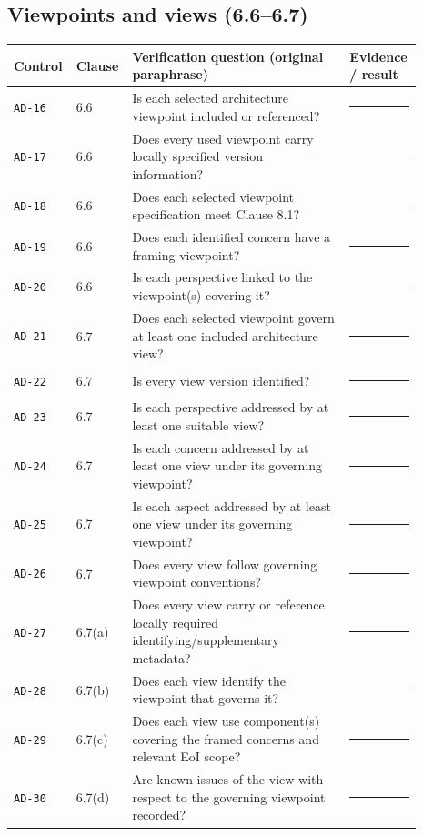 \documentclass[11pt,letterpaper]{article}
\newcommand{\AuditingHead}{\begin{longtable}{p{0.10\linewidth}p{0.10\linewidth}p{0.52\linewidth}p{0.17\linewidth}}\toprule\textbf{Control}&\textbf{Clause}&\textbf{Verification question (original paraphrase)}&\textbf{Evidence / result}\\\midrule\endhead}
\newcommand{\AuditingEnd}{\bottomrule\end{longtable}}
\newcommand{\AuditRow}[4]{\texttt{#1} & #2 & #3 & #4\\}
\begin{document}
\subsection{Viewpoints and views (6.6--6.7)}
\AuditingHead
\AuditRow{AD-16}{6.6}{Is each selected architecture viewpoint included or referenced?}{\rule[-0.4em]{0pt}{2em}\rule{0.60\linewidth}{0.4pt}}
\AuditRow{AD-17}{6.6}{Does every used viewpoint carry locally specified version information?}{\rule[-0.4em]{0pt}{2em}\rule{0.60\linewidth}{0.4pt}}
\AuditRow{AD-18}{6.6}{Does each selected viewpoint specification meet Clause 8.1?}{\rule[-0.4em]{0pt}{2em}\rule{0.60\linewidth}{0.4pt}}
\AuditRow{AD-19}{6.6}{Does each identified concern have a framing viewpoint?}{\rule[-0.4em]{0pt}{2em}\rule{0.60\linewidth}{0.4pt}}
\AuditRow{AD-20}{6.6}{Is each perspective linked to the viewpoint(s) covering it?}{\rule[-0.4em]{0pt}{2em}\rule{0.60\linewidth}{0.4pt}}
\AuditRow{AD-21}{6.7}{Does each selected viewpoint govern at least one included architecture view?}{\rule[-0.4em]{0pt}{2em}\rule{0.60\linewidth}{0.4pt}}
\AuditRow{AD-22}{6.7}{Is every view version identified?}{\rule[-0.4em]{0pt}{2em}\rule{0.60\linewidth}{0.4pt}}
\AuditRow{AD-23}{6.7}{Is each perspective addressed by at least one suitable view?}{\rule[-0.4em]{0pt}{2em}\rule{0.60\linewidth}{0.4pt}}
\AuditRow{AD-24}{6.7}{Is each concern addressed by at least one view under its governing viewpoint?}{\rule[-0.4em]{0pt}{2em}\rule{0.60\linewidth}{0.4pt}}
\AuditRow{AD-25}{6.7}{Is each aspect addressed by at least one view under its governing viewpoint?}{\rule[-0.4em]{0pt}{2em}\rule{0.60\linewidth}{0.4pt}}
\AuditRow{AD-26}{6.7}{Does every view follow governing viewpoint conventions?}{\rule[-0.4em]{0pt}{2em}\rule{0.60\linewidth}{0.4pt}}
\AuditRow{AD-27}{6.7(a)}{Does every view carry or reference locally required identifying/supplementary metadata?}{\rule[-0.4em]{0pt}{2em}\rule{0.60\linewidth}{0.4pt}}
\AuditRow{AD-28}{6.7(b)}{Does each view identify the viewpoint that governs it?}{\rule[-0.4em]{0pt}{2em}\rule{0.60\linewidth}{0.4pt}}
\AuditRow{AD-29}{6.7(c)}{Does each view use component(s) covering the framed concerns and relevant EoI scope?}{\rule[-0.4em]{0pt}{2em}\rule{0.60\linewidth}{0.4pt}}
\AuditRow{AD-30}{6.7(d)}{Are known issues of the view with respect to the governing viewpoint recorded?}{\rule[-0.4em]{0pt}{2em}\rule{0.60\linewidth}{0.4pt}}
\AuditingEnd
\end{document}
